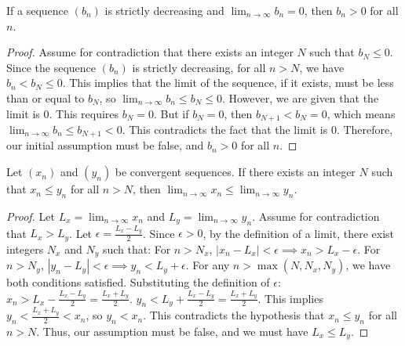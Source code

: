 \begin{lemma}
    \label{lem:Property_of_Monotone_Sequences_Converging_to_Zero}
    If a sequence $(b_n)$ is strictly decreasing and $\lim_{n\to\infty} b_n = 0$, then $b_n > 0$ for all $n$.
\end{lemma}

\begin{proof}
    Assume for contradiction that there exists an integer $N$ such that $b_N \leq 0$. Since the sequence $(b_n)$ is strictly decreasing, for all $n > N$, we have $b_n < b_N \leq 0$. This implies that the limit of the sequence, if it exists, must be less than or equal to $b_N$, so $\lim_{n\to\infty} b_n \leq b_N \leq 0$. However, we are given that the limit is 0. This requires $b_N = 0$. But if $b_N = 0$, then $b_{N+1} < b_N = 0$, which means $\lim_{n\to\infty} b_n \leq b_{N+1} < 0$. This contradicts the fact that the limit is 0. Therefore, our initial assumption must be false, and $b_n > 0$ for all $n$.
\end{proof}

\begin{lemma}
    \label{lem:Limit_Inequality_Property}
    Let $(x_n)$ and $(y_n)$ be convergent sequences. If there exists an integer $N$ such that $x_n \leq y_n$ for all $n > N$, then $\lim_{n \to \infty} x_n \leq \lim_{n \to \infty} y_n$.
\end{lemma}

\begin{proof}
    Let $L_x = \lim_{n \to \infty} x_n$ and $L_y = \lim_{n \to \infty} y_n$. Assume for contradiction that $L_x > L_y$. Let $\epsilon = \frac{L_x - L_y}{2}$. Since $\epsilon > 0$, by the definition of a limit, there exist integers $N_x$ and $N_y$ such that:
    For $n > N_x$, $|x_n - L_x| < \epsilon \implies x_n > L_x - \epsilon$.
    For $n > N_y$, $|y_n - L_y| < \epsilon \implies y_n < L_y + \epsilon$.
    For any $n > \max(N, N_x, N_y)$, we have both conditions satisfied. Substituting the definition of $\epsilon$:
    $x_n > L_x - \frac{L_x - L_y}{2} = \frac{L_x + L_y}{2}$.
    $y_n < L_y + \frac{L_x - L_y}{2} = \frac{L_x + L_y}{2}$.
    This implies $y_n < \frac{L_x + L_y}{2} < x_n$, so $y_n < x_n$. This contradicts the hypothesis that $x_n \leq y_n$ for all $n>N$. Thus, our assumption must be false, and we must have $L_x \leq L_y$.
\end{proof}

